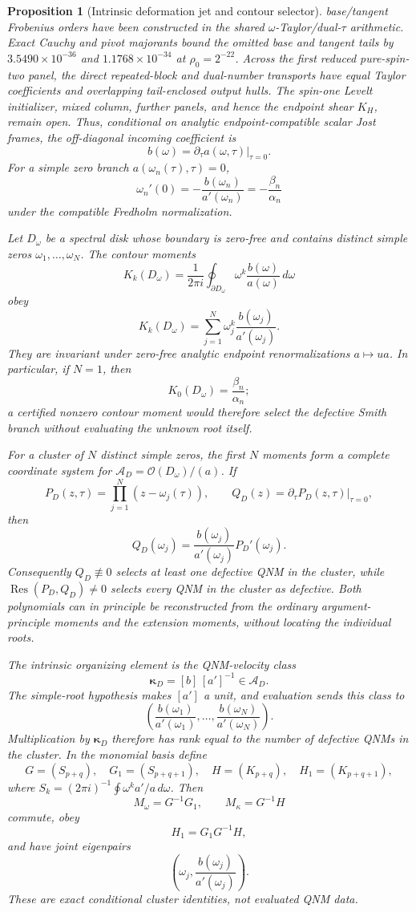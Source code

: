 \documentclass[11pt]{article}
\newtheorem{proposition}[theorem]{Proposition}
\theoremstyle{definition}
\theoremstyle{remark}
\begin{document}
\begin{proposition}[Intrinsic deformation jet and contour selector]
base/tangent Frobenius orders have been constructed in the shared
\(\omega\)-Taylor/dual-\(\tau\) arithmetic.  Exact Cauchy and pivot
majorants bound the omitted base and tangent tails by
\(3.5490\times10^{-36}\) and \(1.1768\times10^{-34}\) at
\(\rho_0=2^{-22}\).  Across the first reduced pure-spin-two panel, the
direct repeated-block and dual-number transports have equal Taylor
coefficients and overlapping tail-enclosed output hulls.  The spin-one
Levelt initializer, mixed column, further panels, and hence the endpoint
shear \(K_H\), remain open.
Thus, conditional on analytic endpoint-compatible scalar Jost frames, the
off-diagonal incoming coefficient is
\[
 b(\omega)=
 \left.\partial_\tau a(\omega,\tau)\right|_{\tau=0}.
\]
For a simple zero branch \(a(\omega_n(\tau),\tau)=0\),
\[
 \omega_n'(0)
 =-\frac{b(\omega_n)}{a'(\omega_n)}
 =-\frac{\beta_n}{\alpha_n}
\]
under the compatible Fredholm normalization.

Let \(D_\omega\) be a spectral disk whose boundary is zero-free and contains
distinct simple zeros \(\omega_1,\ldots,\omega_N\).  The contour moments
\[
 K_k(D_\omega)=\frac1{2\pi i}
 \oint_{\partial D_\omega}
 \omega^k\frac{b(\omega)}{a(\omega)}\,d\omega
\]
obey
\[
 K_k(D_\omega)
 =\sum_{j=1}^N
 \omega_j^k\frac{b(\omega_j)}{a'(\omega_j)}.
\]
They are invariant under zero-free analytic endpoint renormalizations
\(a\mapsto ua\).  In particular, if \(N=1\), then
\[
 K_0(D_\omega)=\frac{\beta_n}{\alpha_n};
\]
a certified nonzero contour moment would therefore select the defective
Smith branch without evaluating the unknown root itself.

For a cluster of \(N\) distinct simple zeros, the first \(N\) moments form a
complete coordinate system for
\(\mathscr A_D=\mathcal O(D_\omega)/(a)\).  If
\[
 P_D(z,\tau)=\prod_{j=1}^N(z-\omega_j(\tau)),
 \qquad
 Q_D(z)=\left.\partial_\tau P_D(z,\tau)\right|_{\tau=0},
\]
then
\[
 Q_D(\omega_j)
 =\frac{b(\omega_j)}{a'(\omega_j)}P_D'(\omega_j).
\]
Consequently \(Q_D\not\equiv0\) selects at least one defective QNM in the
cluster, while
\(\operatorname{Res}(P_D,Q_D)\ne0\) selects every QNM in the cluster as
defective.  Both polynomials can in principle be reconstructed from the
ordinary argument-principle moments and the extension moments, without
locating the individual roots.

The intrinsic organizing element is the QNM-velocity class
\[
 \boldsymbol\kappa_D=[b]\,[a']^{-1}\in\mathscr A_D.
\]
The simple-root hypothesis makes \([a']\) a unit, and evaluation sends this
class to
\[
 \left(
 \frac{b(\omega_1)}{a'(\omega_1)},\ldots,
 \frac{b(\omega_N)}{a'(\omega_N)}
 \right).
\]
Multiplication by \(\boldsymbol\kappa_D\) therefore has rank equal to the
number of defective QNMs in the cluster.  In the monomial basis define
\[
 G=(S_{p+q}),\quad G_1=(S_{p+q+1}),\quad
 H=(K_{p+q}),\quad H_1=(K_{p+q+1}),
\]
where \(S_k=(2\pi i)^{-1}\oint\omega^ka'/a\,d\omega\).  Then
\[
 M_\omega=G^{-1}G_1,\qquad M_\kappa=G^{-1}H
\]
commute, obey
\[
 H_1=G_1G^{-1}H,
\]
and have joint eigenpairs
\[
 \left(\omega_j,\frac{b(\omega_j)}{a'(\omega_j)}\right).
\]
These are exact conditional cluster identities, not evaluated QNM data.


\end{proposition}
\end{document}
